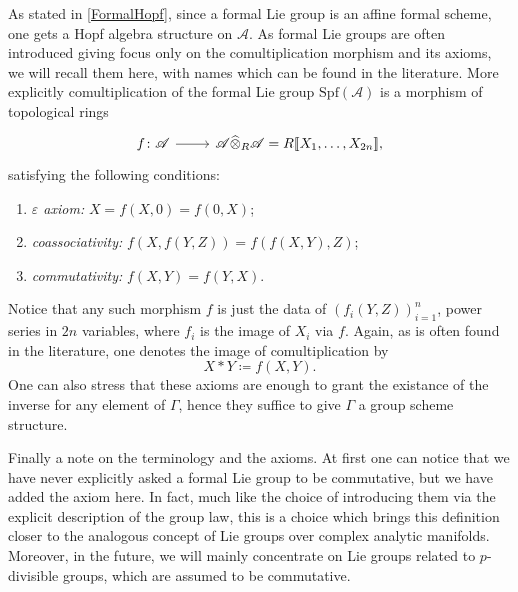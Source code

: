 \documentclass[../Main]{subfiles}
\begin{document}
\begin{rem}[]
	As stated in \cref{FormalHopf}, since a formal Lie group
	is an affine formal scheme, one gets a Hopf algebra structure
	on $\mathscr{A}$.
	As formal Lie groups are often introduced giving focus only
	on the comultiplication morphism and its axioms, we will
	recall them here, with names which can be found in the literature.
	More explicitly comultiplication of the formal Lie group
	$\mathrm{Spf}(\mathscr{A})$ is a morphism of topological rings
	\begin{equation*}
	\begin{tikzcd}[row sep = 0ex
		,/tikz/column 1/.append style={anchor=base east}
		,/tikz/column 2/.append style={anchor=base west}]
		f\colon \mathscr{A} \arrow[r, "", rightarrow] &
		\mathscr{A} \widehat{\otimes}_R \mathscr{A} =
		R [\![ X_1, \ldots, X_{ 2n } ]\!]
	,\end{tikzcd}
	\end{equation*} 
	satisfying the following conditions:
	\begin{enumerate}
		\item {\em $\varepsilon$ axiom:} $X = f(X,0) = f(0,X)$;
		\item {\em coassociativity:} $f(X, f(Y,Z)) = f(f(X,Y), Z)$;
		\item {\em commutativity:} $f(X,Y) = f(Y,X)$.
	\end{enumerate}
	Notice that any such morphism $f$ is just the data of 
	$\left( f_i(Y,Z) \right)_{i=1}^n$, power series in $2n$ variables, where
	$f_i$ is the image of $X_i$ via $f$.
	Again, as is often found in the literature, one denotes the image of
	comultiplication by
	\begin{equation*}
		X \ast Y \coloneqq f(X,Y)
	.\end{equation*} 
	One can also stress that these axioms are enough to grant
	the existance of the inverse for any element of $\Gamma$,
	hence they suffice to give $\Gamma$ a group scheme structure.

	Finally a note on the terminology and the axioms.
	At first one can notice that we have never explicitly asked 
	a formal Lie group to be commutative, but we have added the axiom here.
	In fact, much like the choice of introducing them via the explicit description
	of the group law, this is a choice which brings this definition
	closer to the analogous concept of Lie groups over complex analytic manifolds.
	Moreover, in the future, we will mainly concentrate on Lie groups related to
	$p$-divisible groups, which are assumed to be commutative.
\end{rem}
\end{document}
